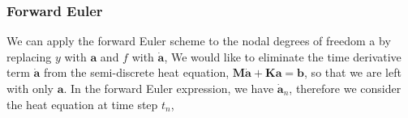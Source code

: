 \documentclass[notes]{beamer}
\begin{document}
\begin{frame}
\frametitle{Forward Euler}
We can apply the forward Euler scheme to the nodal degrees of freedom a by replacing
$y$ with $\mathbf{a}$ and $f$ with $\dot{\mathbf{a}}$,
We would like to eliminate the time derivative term $\dot{\mathbf{a}}$ from the semi-discrete heat equation, $\mathbf{M} \dot{\mathbf{a}} + \mathbf{Ka = b}$, so that we are left with only $\mathbf{a}$. In the forward Euler expression, we have $\dot{\mathbf{a}}_n$, therefore we consider the heat equation at time step $t_n$,
\end{frame}
\end{document}
